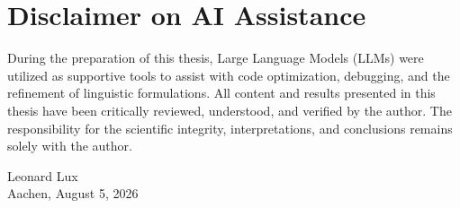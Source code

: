 
\chapter*{Disclaimer on AI Assistance}

During the preparation of this thesis, Large Language Models (LLMs) were utilized as supportive tools to assist with code optimization, debugging, and the refinement of linguistic formulations. 
All content and results presented in this thesis have been critically reviewed, understood, and verified by the author. 
The responsibility for the scientific integrity, interpretations, and conclusions remains solely with the author.

\vfill

\begin{flushright}
    Leonard Lux\\
    Aachen, August 5, 2026
\end{flushright}

\clearpage
